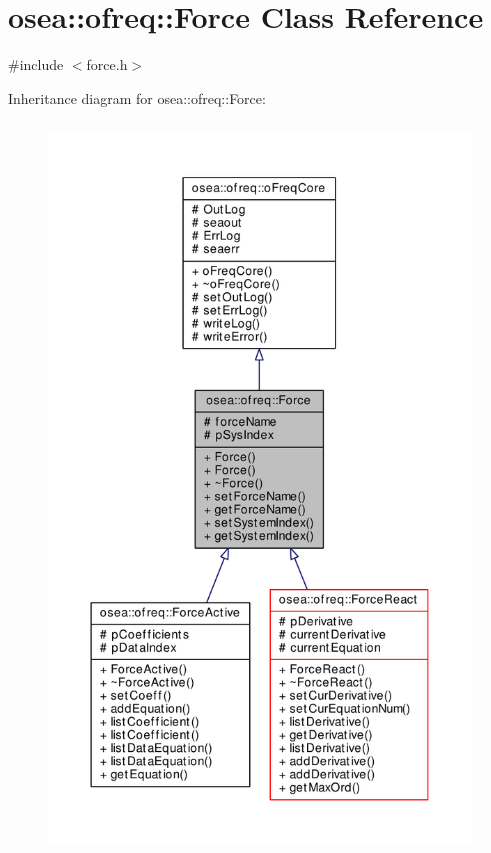 \hypertarget{classosea_1_1ofreq_1_1_force}{\section{osea\-:\-:ofreq\-:\-:Force Class Reference}
\label{classosea_1_1ofreq_1_1_force}
}


{\ttfamily \#include $<$force.\-h$>$}



Inheritance diagram for osea\-:\-:ofreq\-:\-:Force\-:\nopagebreak
\begin{figure}[H]
\begin{center}
\leavevmode
\includegraphics[height=550pt]{classosea_1_1ofreq_1_1_force__inherit__graph}
\end{center}
\end{figure}
